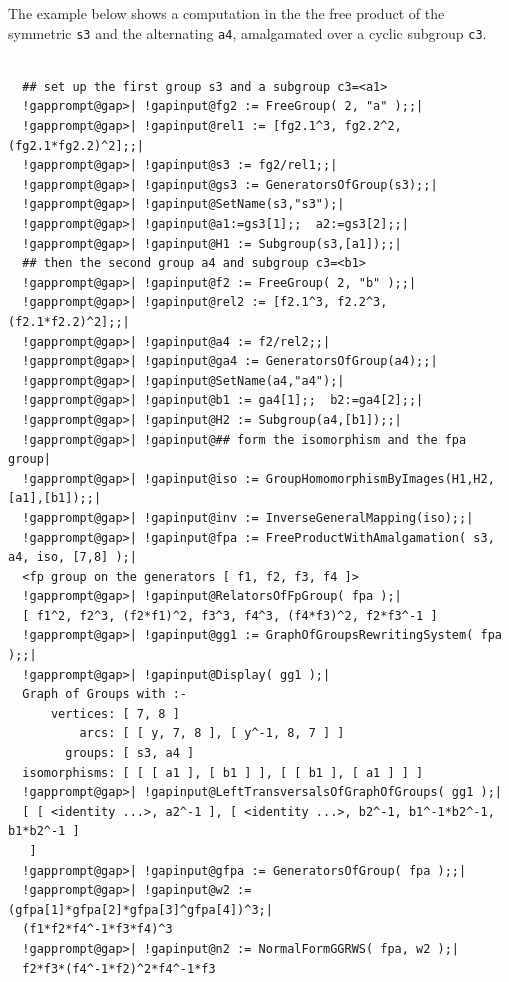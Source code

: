 \documentclass[a4paper,11pt]{report}
\begin{document}
{{{ The example below shows a computation in the the free product of the symmetric \texttt{s3} and the alternating \texttt{a4}, amalgamated over a cyclic subgroup \texttt{c3}. 

 }

 
\begin{Verbatim}[commandchars=!@|,fontsize=\small,frame=single,label=Example]
  
  ## set up the first group s3 and a subgroup c3=<a1>
  !gapprompt@gap>| !gapinput@fg2 := FreeGroup( 2, "a" );;|
  !gapprompt@gap>| !gapinput@rel1 := [fg2.1^3, fg2.2^2, (fg2.1*fg2.2)^2];;|
  !gapprompt@gap>| !gapinput@s3 := fg2/rel1;;|
  !gapprompt@gap>| !gapinput@gs3 := GeneratorsOfGroup(s3);;|
  !gapprompt@gap>| !gapinput@SetName(s3,"s3");|
  !gapprompt@gap>| !gapinput@a1:=gs3[1];;  a2:=gs3[2];;|
  !gapprompt@gap>| !gapinput@H1 := Subgroup(s3,[a1]);;|
  ## then the second group a4 and subgroup c3=<b1>
  !gapprompt@gap>| !gapinput@f2 := FreeGroup( 2, "b" );;|
  !gapprompt@gap>| !gapinput@rel2 := [f2.1^3, f2.2^3, (f2.1*f2.2)^2];;|
  !gapprompt@gap>| !gapinput@a4 := f2/rel2;;|
  !gapprompt@gap>| !gapinput@ga4 := GeneratorsOfGroup(a4);;|
  !gapprompt@gap>| !gapinput@SetName(a4,"a4");|
  !gapprompt@gap>| !gapinput@b1 := ga4[1];;  b2:=ga4[2];;|
  !gapprompt@gap>| !gapinput@H2 := Subgroup(a4,[b1]);;|
  !gapprompt@gap>| !gapinput@## form the isomorphism and the fpa group|
  !gapprompt@gap>| !gapinput@iso := GroupHomomorphismByImages(H1,H2,[a1],[b1]);;|
  !gapprompt@gap>| !gapinput@inv := InverseGeneralMapping(iso);;|
  !gapprompt@gap>| !gapinput@fpa := FreeProductWithAmalgamation( s3, a4, iso, [7,8] );|
  <fp group on the generators [ f1, f2, f3, f4 ]>
  !gapprompt@gap>| !gapinput@RelatorsOfFpGroup( fpa );|
  [ f1^2, f2^3, (f2*f1)^2, f3^3, f4^3, (f4*f3)^2, f2*f3^-1 ]
  !gapprompt@gap>| !gapinput@gg1 := GraphOfGroupsRewritingSystem( fpa );;|
  !gapprompt@gap>| !gapinput@Display( gg1 );|
  Graph of Groups with :- 
      vertices: [ 7, 8 ]
          arcs: [ [ y, 7, 8 ], [ y^-1, 8, 7 ] ]
        groups: [ s3, a4 ]
  isomorphisms: [ [ [ a1 ], [ b1 ] ], [ [ b1 ], [ a1 ] ] ]
  !gapprompt@gap>| !gapinput@LeftTransversalsOfGraphOfGroups( gg1 );|
  [ [ <identity ...>, a2^-1 ], [ <identity ...>, b2^-1, b1^-1*b2^-1, b1*b2^-1 ] 
   ]
  !gapprompt@gap>| !gapinput@gfpa := GeneratorsOfGroup( fpa );;|
  !gapprompt@gap>| !gapinput@w2 := (gfpa[1]*gfpa[2]*gfpa[3]^gfpa[4])^3;|
  (f1*f2*f4^-1*f3*f4)^3
  !gapprompt@gap>| !gapinput@n2 := NormalFormGGRWS( fpa, w2 );|
  f2*f3*(f4^-1*f2)^2*f4^-1*f3
  
\end{Verbatim}
 

}}
\end{document}
